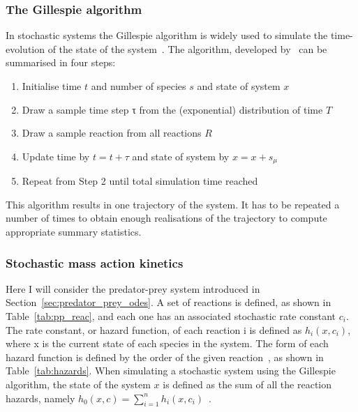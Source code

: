 \subsubsection{The Gillespie algorithm}
 In stochastic systems the Gillespie algorithm is widely used to simulate the time-evolution of the state of the system~\autocite{Wilkinson:2006td}. The algorithm, developed by~\textcite{Gillespie:1977ww} can be summarised in four steps:
\begin{enumerate}
\item Initialise time $t$ and number of species $s$ and state of system $x$
\item Draw a sample time step τ from the (exponential) distribution of time $Τ$
\item Draw a sample reaction from all reactions $R$
\item Update time by $t = t + τ$ and state of system by $x = x + s_μ$
\item Repeat from Step 2 until total simulation time reached
\end{enumerate}
   
\noindent This algorithm results in one trajectory of the system. It has to be repeated a number of times to obtain enough realisations of the trajectory to compute appropriate summary statistics.

\subsubsection{Stochastic mass action kinetics}
Here I will consider the predator-prey system introduced in Section~\ref{sec:predator_prey_odes}. A set of reactions is defined, as shown in Table~\ref{tab:pp_reac}, and each one has an associated stochastic rate constant $c_i$. The rate constant, or hazard function, of each reaction i is defined as $h_i(x, c_i)$, where x is the current state of each species in the system. The form of each hazard function is defined by the order of the given reaction~\autocite{Wilkinson:2006td}, as shown in Table~\ref{tab:hazards}. When simulating a stochastic system using the Gillespie algorithm, the state of the system $x$ is defined as the sum of all the reaction hazards, namely $h_0(x, c) = \sum_{i=1}^{n}h_{i}(x, c_i)$~\autocite{Wilkinson:2006td}. 



